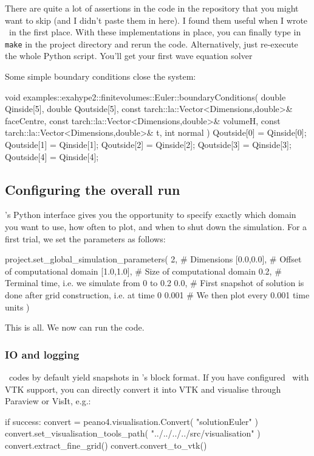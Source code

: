 \noindent
There are quite a lot of assertions in the code in the repository that you might
want to skip (and I didn't paste them in here).
I found them useful when I wrote \ExaHyPE\ in the first place.
With these implementations in place, you can finally type in \texttt{make} in
the project directory and rerun the code.
Alternatively, just re-execute the whole Python script.
You'll get your first wave equation solver

Some simple boundary conditions close the system:

\begin{code}
void examples::exahype2::finitevolumes::Euler::boundaryConditions(
  double                                       Qinside[5],
  double                                       Qoutside[5],
  const tarch::la::Vector<Dimensions,double>&  faceCentre,
  const tarch::la::Vector<Dimensions,double>&  volumeH,
  const tarch::la::Vector<Dimensions,double>&  t,
  int                                          normal
) {
  Qoutside[0] = Qinside[0];
  Qoutside[1] = Qinside[1];
  Qoutside[2] = Qinside[2];
  Qoutside[3] = Qinside[3];
  Qoutside[4] = Qinside[4];
}
\end{code}



\subsection{Configuring the overall run}

\ExaHyPE's Python interface gives you the opportunity to specify exactly which
domain you want to use, how often to plot, and when to shut down the simulation.
For a first trial, we set the parameters as follows:
\begin{code}
project.set_global_simulation_parameters(
  2,         # Dimensions
  [0.0,0.0], # Offset of computational domain
  [1.0,1.0], # Size of computational domain
  0.2,       # Terminal time, i.e. we simulate from 0 to 0.2
  0.0,       # First snapshot of solution is done after grid construction, i.e. at time 0
  0.001      # We then plot every 0.001 time units
)
\end{code}
\noindent
This is all. We now can run the code.


\subsubsection{IO and logging}


\ExaHyPE\ codes by default yield snapshots in \Peano's block format. 
If you have configured \Peano\ with VTK support, you can directly convert it
into VTK and visualise through Paraview or VisIt, e.g.:
\begin{code}
if success:
  convert = peano4.visualisation.Convert( "solutionEuler" )
  convert.set_visualisation_tools_path( "../../../../src/visualisation" )
  convert.extract_fine_grid()
  convert.convert_to_vtk()
\end{code}



